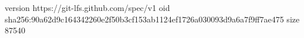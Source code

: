 version https://git-lfs.github.com/spec/v1
oid sha256:90a62d9c164342260e2f50b3cf153ab1124ef1726a030093d9a6a7f9ff7ae475
size 87540
